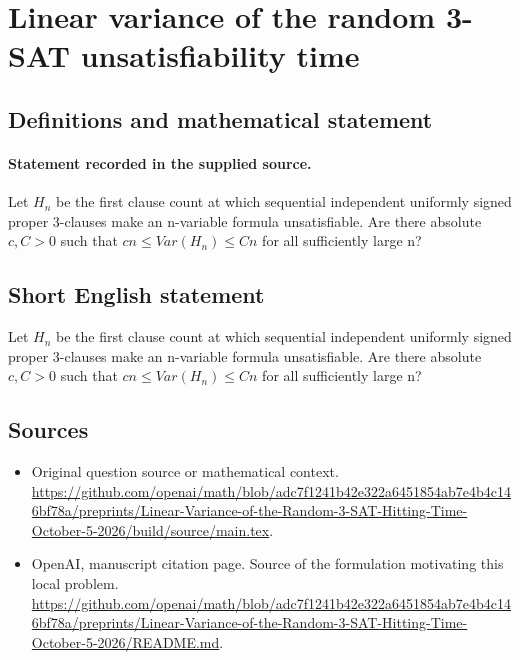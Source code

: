 \documentclass[11pt]{article}
\begin{document}
\section*{Linear variance of the random 3-SAT unsatisfiability time}\label{statement}
\subsection{Definitions and mathematical statement}
\paragraph{Statement recorded in the supplied source.}
Let $H_n$ be the first clause count at which sequential independent uniformly signed proper 3-clauses make an n-variable formula unsatisfiable. Are there absolute $c,C>0$ such that $cn\leq Var(H_n)\leq Cn$ for all sufficiently large n?
\subsection{Short English statement}
Let $H_n$ be the first clause count at which sequential independent uniformly signed proper 3-clauses make an n-variable formula unsatisfiable. Are there absolute $c,C>0$ such that $cn\leq Var(H_n)\leq Cn$ for all sufficiently large n?
\subsection{Sources}
\begin{itemize}
\item[S1] Original question source or mathematical context.
\url{https://github.com/openai/math/blob/adc7f1241b42e322a6451854ab7e4b4c146bf78a/preprints/Linear-Variance-of-the-Random-3-SAT-Hitting-Time-October-5-2026/build/source/main.tex}.
\item[S2] OpenAI, manuscript citation page. Source of the formulation motivating this local problem.
\url{https://github.com/openai/math/blob/adc7f1241b42e322a6451854ab7e4b4c146bf78a/preprints/Linear-Variance-of-the-Random-3-SAT-Hitting-Time-October-5-2026/README.md}.
\end{itemize}
\end{document}
